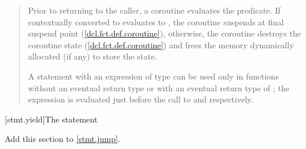 \begin{quote}

\pnum
Prior to returning to the caller, a coroutine evaluates
the  predicate. If  contextually converted to  evaluates to
, the coroutine suspends at final suspend point (\ref{dcl.fct.def.coroutine}),
otherwise, the coroutine destroys the coroutine state (\ref{dcl.fct.def.coroutine}) and frees the memory dynamically allocated (if any) to store the state.

\pnum
A  statement with an expression of type \cvvoid{ }can be used only in functions without an eventual return type 
or with an eventual return type of ; the expression is evaluated just before the call to  and  respectively.


%

\end{quote}

[stmt.yield]{The  statement}%

Add this section to \ref{stmt.jump}.

